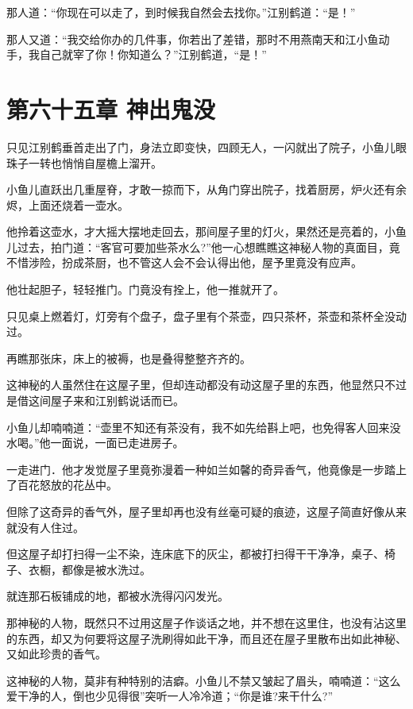 \documentclass[12pt,oneside]{book}
\begin{document}
那人道：``你现在可以走了，到时候我自然会去找你。''江别鹤道：``是！''

那人又道：``我交给你办的几件事，你若出了差错，那时不用燕南天和江小鱼动手，我自己就宰了你！你知道么？''江别鹤道，``是！''

\hypertarget{ux7b2cux516dux5341ux4e94ux7ae0-ux795eux51faux9b3cux6ca1}{%
\chapter{第六十五章
神出鬼没}\label{ux7b2cux516dux5341ux4e94ux7ae0-ux795eux51faux9b3cux6ca1}}

只见江别鹤垂首走出了门，身法立即变快，四顾无人，一闪就出了院子，小鱼儿眼珠子一转也悄悄自屋檐上溜开。

小鱼儿直跃出几重屋脊，才敢一掠而下，从角门穿出院子，找着厨房，炉火还有余烬，上面还烧着一壶水。

他拎着这壶水，才大摇大摆地走回去，那间屋子里的灯火，果然还是亮着的，小鱼儿过去，拍门道：``客官可要加些茶水么?''他一心想瞧瞧这神秘人物的真面目，竟不惜涉险，扮成茶厨，也不管这人会不会认得出他，屋予里竟没有应声。

他壮起胆子，轻轻推门。门竟没有拴上，他一推就开了。

只见桌上燃着灯，灯旁有个盘子，盘子里有个茶壶，四只茶杯，茶壶和茶杯全没动过。

再瞧那张床，床上的被褥，也是叠得整整齐齐的。

这神秘的人虽然住在这屋子里，但却连动都没有动这屋子里的东西，他显然只不过是借这间屋子来和江别鹤说话而已。

小鱼儿却喃喃道：``壶里不知还有茶没有，我不如先给斟上吧，也免得客人回来没水喝。''他一面说，一面已走进房子。

一走进门．他才发觉屋子里竟弥漫着一种如兰如馨的奇异香气，他竟像是一步踏上了百花怒放的花丛中。

但除了这奇异的香气外，屋子里却再也没有丝毫可疑的痕迹，这屋子简直好像从来就没有人住过。

但这屋子却打扫得一尘不染，连床底下的灰尘，都被打扫得干干净净，桌子、椅子、衣橱，都像是被水洗过。

就连那石板铺成的地，都被水洗得闪闪发光。

那神秘的人物，既然只不过用这屋子作谈话之地，并不想在这里住，也没有沾这里的东西，却又为何要将这屋子洗刷得如此干净，而且还在屋子里散布出如此神秘、又如此珍贵的香气。

这神秘的人物，莫非有种特别的洁癖。小鱼儿不禁又皱起了眉头，喃喃道：``这么爱干净的人，倒也少见得很''突听一人冷冷道；``你是谁?来干什么?''
\end{document}
